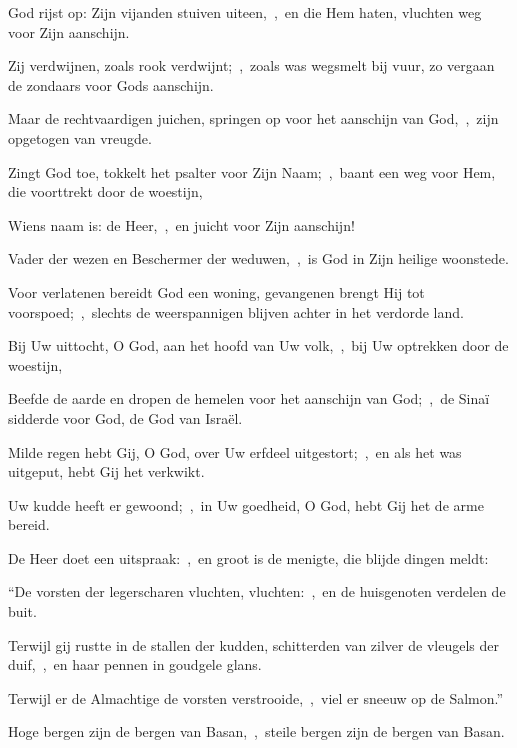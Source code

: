 \documentclass[12pt,twoside,a5paper]{article}
\begin{document}

\begin{halfparskip}
   God rijst op: Zijn vijanden stuiven uiteen,~\sep\ en die Hem haten, vluchten weg voor Zijn aanschijn.


  Zij verdwijnen, zoals rook verdwijnt;~\sep\ zoals was wegsmelt bij vuur, zo vergaan de zondaars voor Gods
  aanschijn.

  Maar de rechtvaardigen juichen, springen op voor het aanschijn van God,~\sep\ zijn opgetogen van vreugde.

  Zingt God toe, tokkelt het psalter voor Zijn Naam;~\sep\ baant een weg voor Hem, die voorttrekt door de woestijn,

  Wiens naam is: de Heer,~\sep\ en juicht voor Zijn aanschijn!

  Vader der wezen en Beschermer der weduwen,~\sep\ is God in Zijn heilige woonstede.

  Voor verlatenen bereidt God een woning, gevangenen brengt Hij tot voorspoed;~\sep\ slechts de weerspannigen blijven achter in het verdorde land.

  Bij Uw uittocht, O God, aan het hoofd van Uw volk,~\sep\ bij Uw optrekken door de woestijn,

  Beefde de aarde en dropen de hemelen voor het aanschijn van God;~\sep\ de Sinaï sidderde voor God, de God van Israël.

  Milde regen hebt Gij, O God, over Uw erfdeel uitgestort;~\sep\ en als het was uitgeput, hebt Gij het verkwikt.

  Uw kudde heeft er gewoond;~\sep\ in Uw goedheid, O God, hebt Gij het de arme bereid.

  De Heer doet een uitspraak:~\sep\ en groot is de menigte, die blijde dingen meldt:

  ``De vorsten der legerscharen vluchten, vluchten:~\sep\ en de huisgenoten verdelen de buit.

  Terwijl gij rustte in de stallen der kudden, schitterden van zilver de vleugels der duif,~\sep\ en haar pennen in goudgele glans.

  Terwijl er de Almachtige de vorsten verstrooide,~\sep\ viel er sneeuw op de Salmon.''

  Hoge bergen zijn de bergen van Basan,~\sep\ steile bergen zijn de bergen van Basan.


\end{halfparskip}
\end{document}
